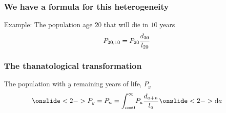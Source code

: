\documentclass{beamer}
\begin{document}

\begin{frame}
\frametitle{We have a formula for this heterogeneity}
\begin{block}{Example: The population age $20$ that will die in $10$ years}
 \begin{equation}
   P_{20,10} = P_{20} \frac{d_{30}}{l_{20}} \notag
 \end{equation}
 \end{block}
\end{frame}







\begin{frame}
\frametitle{The thanatological transformation}
\begin{block}{The population with $y$ remaining years of life, $P_y$}
 \begin{equation}
   \onslide<2->{P_y = P_{n} = \int_{a=0}^\infty} P_a \frac{d_{a+n}}{l_a}
   \onslide<2->{\mathrm{d} a}
 \end{equation}
 \end{block}
\end{frame}
\end{document}
